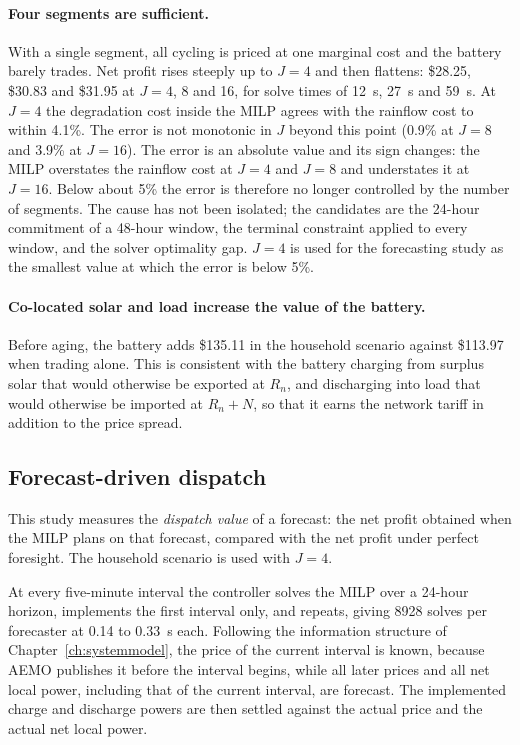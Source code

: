 

\paragraph{Four segments are sufficient.}
With a single segment, all cycling is priced at one marginal cost and the battery barely
trades. Net profit rises steeply up to $J = 4$ and then flattens: \$28.25, \$30.83 and
\$31.95 at $J = 4$, 8 and 16, for solve times of 12~s, 27~s and 59~s. At $J = 4$ the
degradation cost inside the MILP agrees with the rainflow cost to within 4.1\%. The
error is not monotonic in $J$ beyond this point (0.9\% at $J = 8$ and 3.9\% at
$J = 16$). The error is an absolute value and its sign changes: the MILP overstates the
rainflow cost at $J = 4$ and $J = 8$ and understates it at $J = 16$. Below about 5\% the
error is therefore no longer controlled by the number of segments. The cause has not
been isolated; the candidates are the 24-hour commitment of a 48-hour window, the
terminal constraint applied to every window, and the solver optimality gap. $J = 4$ is
used for the forecasting study as the smallest value at which the error is below 5\%.



\paragraph{Co-located solar and load increase the value of the battery.}
Before aging, the battery adds \$135.11 in the household scenario against \$113.97 when
trading alone. This is consistent with the battery charging from surplus solar that
would otherwise be exported at $R_n$, and discharging into load that would otherwise be
imported at $R_n + N$, so that it earns the network tariff in addition to the price
spread.

\subsection{Forecast-driven dispatch}
\label{sec:results:mpc}

This study measures the \emph{dispatch value} of a forecast: the net profit obtained
when the MILP plans on that forecast, compared with the net profit under perfect
foresight. The household scenario is used with $J = 4$.

At every five-minute interval the controller solves the MILP over a 24-hour horizon,
implements the first interval only, and repeats, giving 8928 solves per forecaster at
0.14 to 0.33~s each. Following the information structure of
Chapter~\ref{ch:systemmodel}, the price of the current interval is known, because AEMO
publishes it before the interval begins, while all later prices and all net local power,
including that of the current interval, are forecast. The implemented charge and
discharge powers are then settled against the actual price and the actual net local
power.

